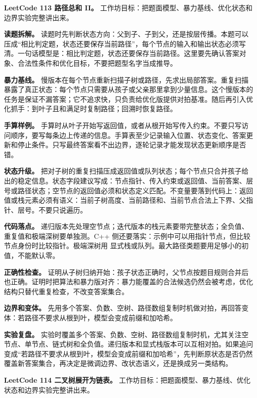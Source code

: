 \noindent\textbf{LeetCode 113 路径总和 II。} 工作坊目标：把题面模型、暴力基线、优化状态和边界实验完整讲出来。

\textbf{读题拆解。} 读题时先判断状态方向：父到子、子到父，还是按层传播。本题可以压成“相比判定题，状态还要保存当前路径”，每个节点的输入和输出状态必须写清。一句话模型是：相比判定题，状态还要保存当前路径。这里要先确认答案对象、合法性条件和优化目标，不要把题型名字当成推导。

\textbf{暴力基线。} 慢版本在每个节点重新扫描子树或路径，先求出局部答案。重复扫描暴露了真正状态：每个节点只需要从孩子或父亲那里拿到少量信息。这个慢版本的任务是保证不漏答案；它不追求快，只负责给优化版提供对拍基准。随后再引入优化抓手：到叶子且和满足时复制路径；回溯时恢复路径。

\textbf{手算样例。} 手算时从叶子开始写返回值，或者从根开始写传入约束。不要只写访问顺序，要写每条边上传递的信息。手算表至少记录输入位置、状态变化、答案更新和停止条件。只写最终答案看不出边界，逐轮记录才能发现状态更新顺序是否错。

\textbf{状态升级。} 把对子树的重复扫描压成返回值或队列状态；每个节点只合并孩子给出的稳定信息。状态字段建议写成：节点指针、传入约束或返回值、当前答案、层号或路径状态；空节点的返回值必须和状态定义匹配。不变量要落到代码上：返回值或栈元素必须有语义：当前子树高度、当前路径和、当前节点合法上下界、父指针、层号。不要只说遍历。

\textbf{代码落点。} 递归版本先处理空节点；迭代版本的栈元素要带完整状态；全负值、重复值和极端深树要单独测。C++ 侧还要落实：示例中可以用指针节点，但比较节点身份时比较指针。极端深树用  显式栈或队列。最大路径类题要用足够小的初值，不能默认零。

\textbf{正确性检查。} 证明从子树归纳开始：孩子状态正确时，父节点按题目规则合并后也正确。证明时把算法和暴力版对齐：暴力能覆盖的合法候选仍然会被考虑，优化结构只替代重复检查，不改变答案集合。

\textbf{边界和变体。} 先用多个答案、负数、空树、路径数组复制时机做对拍，再回答变体：若路径不要求从根到叶，模型会变成前缀和加哈希。

\textbf{实验复盘。} 实验时覆盖多个答案、负数、空树、路径数组复制时机，尤其关注空节点、单节点、链式树和全负值。递归版本和显式栈版本可以互相对拍。如果追问变成“若路径不要求从根到叶，模型会变成前缀和加哈希”，先判断原状态是否仍然覆盖新答案集合，再决定是微调边界、改状态语义，还是换成另一类结构。

\noindent\textbf{LeetCode 114 二叉树展开为链表。} 工作坊目标：把题面模型、暴力基线、优化状态和边界实验完整讲出来。

